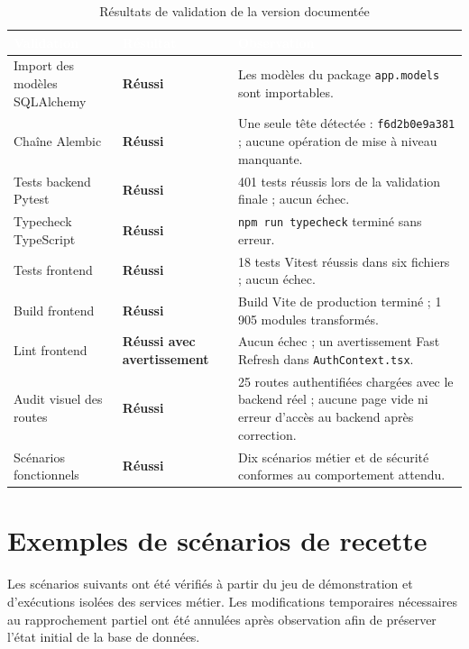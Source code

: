 \documentclass[12pt,a4paper,oneside]{report}
\newcommand{\TableSetup}{%
  \arrayrulecolor{ComptaTableLine}%
  \setlength{\arrayrulewidth}{0.45pt}%
  \renewcommand{\arraystretch}{1.18}%
}
\newcommand{\TableHead}[1]{\textcolor{white}{\textbf{#1}}}
\newcommand{\TableSuccess}[1]{\textcolor{ComptaGreen}{\textbf{#1}}}
\begin{document}
\begin{table}[H]
\centering
\caption{Résultats de validation de la version documentée}
\TableSetup
\begin{tabularx}{\textwidth}{|L{4.6cm}|L{3.4cm}|Y|}
\toprule
{}\TableHead{Validation} & \TableHead{Résultat} & \TableHead{Observation} \\
\midrule
Import des modèles SQLAlchemy & \TableSuccess{Réussi} & Les modèles du package \texttt{app.models} sont importables. \\
Chaîne Alembic & \TableSuccess{Réussi} & Une seule tête détectée : \texttt{f6d2b0e9a381} ; aucune opération de mise à niveau manquante. \\
Tests backend Pytest & \TableSuccess{Réussi} & 401 tests réussis lors de la validation finale ; aucun échec. \\
Typecheck TypeScript & \TableSuccess{Réussi} & \texttt{npm run typecheck} terminé sans erreur. \\
Tests frontend & \TableSuccess{Réussi} & 18 tests Vitest réussis dans six fichiers ; aucun échec. \\
Build frontend & \TableSuccess{Réussi} & Build Vite de production terminé ; 1\,905 modules transformés. \\
Lint frontend & \textcolor{ComptaSlate}{\textbf{Réussi avec avertissement}} & Aucun échec ; un avertissement Fast Refresh dans \texttt{AuthContext.tsx}. \\
Audit visuel des routes & \TableSuccess{Réussi} & 25 routes authentifiées chargées avec le backend réel ; aucune page vide ni erreur d'accès au backend après correction. \\
Scénarios fonctionnels & \TableSuccess{Réussi} & Dix scénarios métier et de sécurité conformes au comportement attendu. \\
\bottomrule
\end{tabularx}
\end{table}

\section{Exemples de scénarios de recette}

Les scénarios suivants ont été vérifiés à partir du jeu de démonstration et
d'exécutions isolées des services métier. Les modifications temporaires
nécessaires au rapprochement partiel ont été annulées après observation afin de
préserver l'état initial de la base de données.
\end{document}
